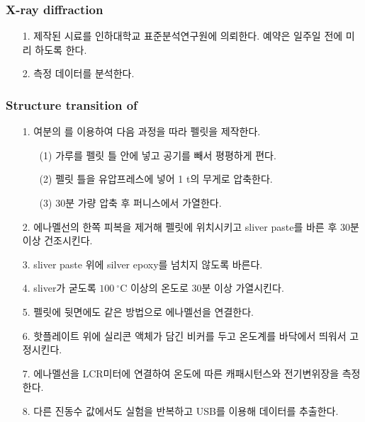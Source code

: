 \documentclass[aps,reprint,superscriptaddress,11pt]{revtex4-2}
\begin{document}
\subsubsection{X-ray diffraction}
\begin{itemize}
  \item[1. ] 제작된 시료를 인하대학교 표준분석연구원에 의뢰한다. 예약은 일주일 전에 미리 
  하도록 한다.
  \item[2. ] 측정 데이터를 분석한다.
\end{itemize}
\subsubsection{Structure transition of  }
\begin{itemize}
  \item[1. ] 여분의 를 이용하여 다음 과정을 따라 펠릿을 제작한다.
  \begin{itemize}
    \item [(1)] 가루를 펠릿 틀 안에 넣고 공기를 빼서 평평하게 편다.
    \item [(2)] 펠릿 틀을 유압프레스에 넣어 1 t의 무게로 압축한다.
    \item [(3)] 30분 가량 압축 후 퍼니스에서 가열한다.
  \end{itemize}
  \item[2. ] 에나멜선의 한쪽 피복을 제거해 펠릿에 위치시키고 sliver paste를 바른 후 30분 이상 건조시킨다.
  \item[3. ] sliver paste 위에 silver epoxy를 넘치지 않도록 바른다.
  \item[4. ] sliver가 굳도록 $100~\mathrm{^\circ C}$ 이상의 온도로 30분 이상 가열시킨다.
  \item[5. ] 펠릿에 뒷면에도 같은 방법으로 에나멜선을 연결한다.
  \item[6. ] 핫플레이트 위에 실리콘 액체가 담긴 비커를 두고 온도계를 바닥에서 띄워서 고정시킨다.
  \item[7. ] 에나멜선을 LCR미터에 연결하여 온도에 따른 캐패시턴스와 전기변위장을 측정한다.
  \item[8. ] 다른 진동수 값에서도 실험을 반복하고 USB를 이용해 데이터를 추출한다.
\end{itemize}
\nocite{*} 





\vfill
\end{document}
